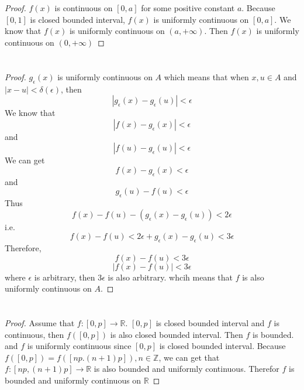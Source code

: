 \documentclass{article}
\begin{document}
    \section{}
        \begin{proof}
            $f(x)$ is continuous on $[0,a]$ for some positive constant $a$. Because $[0,1]$ is closed bounded interval, $f(x)$ is uniformly continuous on $[0,a]$. We know that $f(x)$ is uniformly continuous on $(a,+\infty)$. Then $f(x)$ is uniformly continuous on $(0,+\infty)$ 
        \end{proof}

    \section{}
        \begin{proof}
            $g_\epsilon(x)$ is uniformly continuous on $A$ which means that when $x,u\in A$ and $|x-u|<\delta(\epsilon)$, then $$|g_\epsilon(x)-g_\epsilon(u)|<\epsilon$$
            We know that
            $$|f(x)-g_\epsilon(x)|<\epsilon$$
            and 
            $$|f(u)-g_\epsilon(u)|<\epsilon$$
            We can get
            $$f(x)-g_\epsilon(x)<\epsilon$$
            and 
            $$g_\epsilon(u)-f(u)<\epsilon$$
            Thus
            $$f(x)-f(u)-(g_\epsilon(x)-g_\epsilon(u))<2\epsilon$$
            i.e.
            $$f(x)-f(u)<2\epsilon+g_\epsilon(x)-g_\epsilon(u)<3\epsilon$$
            Therefore,
            $$f(x)-f(u)<3\epsilon$$
            $$|f(x)-f(u)|<3\epsilon$$
            where $\epsilon$ is arbitrary, then $3\epsilon$ is also arbitrary.
            whcih means that $f$ is also uniformly continuous on $A$.
        \end{proof}
    \section{}
        \begin{proof}
            Assume that $f:[0,p]\rightarrow\mathbb{R}$. $[0,p]$ is closed bounded interval and $f$ is continuous, then $f([0,p])$ is also closed bounded interval. Then $f$ is bounded. and $f$ is uniformly continuous since $[0,p]$ is closed bounded interval. Because $f([0,p])=f([np.(n+1)p]), n\in\mathbb{Z}$, we can get that $f:[np,(n+1)p]\rightarrow \mathbb{R}$ is also bounded and uniformly continuous.
            Therefor $f$ is bounded and uniformly continuous on $\mathbb{R}$ 
        \end{proof}
    \section{}
\end{document}
